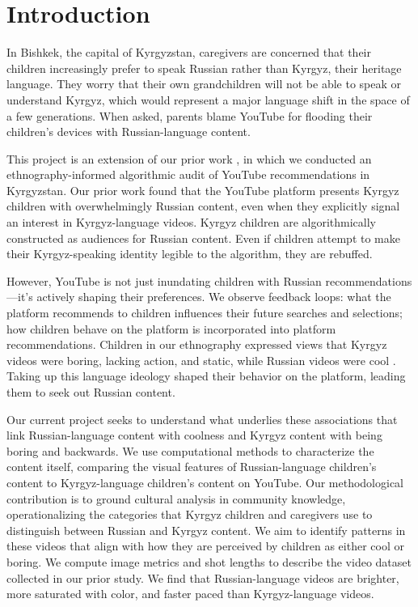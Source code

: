 \documentclass[12pt, letterpaper]{article}
\begin{document}
\begin{abstract}
\medskip
\noindent \textbf{Keywords:} algorithmic auditing; language ideology; visual semiotics; YouTube; Kyrgyz; colonial amplification; digital media; thumbnails
\end{abstract}

\newpage
\tableofcontents
\newpage

\section{Introduction}

In Bishkek, the capital of Kyrgyzstan, caregivers are concerned that their children increasingly prefer to speak Russian rather than Kyrgyz, their heritage language. They worry that their own grandchildren will not be able to speak or understand Kyrgyz, which would represent a major language shift in the space of a few generations. When asked, parents blame YouTube for flooding their children's devices with Russian-language content.

This project is an extension of our prior work \citep{escher2026empire, mcdermott2026}, in which we conducted an ethnography-informed algorithmic audit of YouTube recommendations in Kyrgyzstan. Our prior work found that the YouTube platform presents Kyrgyz children with overwhelmingly Russian content, even when they explicitly signal an interest in Kyrgyz-language videos. Kyrgyz children are algorithmically constructed as audiences for Russian content. Even if children attempt to make their Kyrgyz-speaking identity legible to the algorithm, they are rebuffed. 

However, YouTube is not just inundating children with Russian recommendations---it’s actively shaping their preferences. We observe feedback loops: what the platform recommends to children influences their future searches and selections; how children behave on the platform is incorporated into platform recommendations.
Children in our ethnography expressed views that Kyrgyz videos were boring, lacking action, and static, while Russian videos were cool \citep{mcdermott2026}. Taking up this language ideology shaped their behavior on the platform, leading them to seek out Russian content.

Our current project seeks to understand what underlies these associations that link Russian-language content with coolness and Kyrgyz content with being boring and backwards. We use computational methods to characterize the content itself, comparing the visual features of Russian-language children’s content to Kyrgyz-language children’s content on YouTube. Our methodological contribution is to ground cultural analysis in community knowledge, operationalizing the categories that Kyrgyz children and caregivers use to distinguish between Russian and Kyrgyz content. We aim to identify patterns in these videos that align with how they are perceived by children as either cool or boring. We compute image metrics and shot lengths to describe the video dataset collected in our prior study. We find that Russian-language videos are brighter, more saturated with color, and faster paced than Kyrgyz-language videos. 
\end{document}
